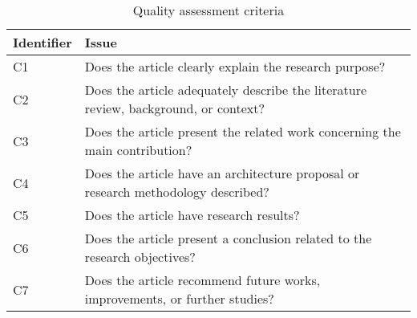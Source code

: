 \begin{table*}[tb]
\centering
\renewcommand{\arraystretch}{1.5}
\caption{Quality assessment criteria}
\label{table_quality}
\begin{tabularx}{\textwidth}{l@{\hspace{8em}}l}
\hline
Identifier & Issue \\ \hline
C1 & Does the article clearly explain the research purpose? \\
C2 & Does the article adequately describe the literature review, background, or context? \\
C3 & Does the article present the related work concerning the main contribution? \\
C4 & Does the article have an architecture proposal or research methodology described? \\
C5 & Does the article have research results? \\
C6 & Does the article present a conclusion related to the research objectives? \\
C7 & Does the article recommend future works, improvements, or further studies? \\ \hline
\end{tabularx}
\end{table*}
